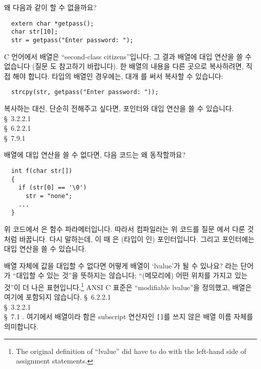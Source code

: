 \begin{faq}
	왜 다음과 같이 할 수 없을까요?
\begin{verbatim}
  extern char *getpass();
  char str[10];
  str = getpass("Enter password: ");
\end{verbatim}
\A
	C 언어에서 배열은 ``second-class citizens''입니다; 그 결과 배열에
	대입 연산을 쓸 수 없습니다 (질문 도 참고하기 바랍니다). 한 배열의
	내용을 다른 곳으로 복사하려면, 직접 해야 합니다.  타입의
	배열인 경우에는, 대개 를 써서 복사할 수 있습니다:
\begin{verbatim}
  strcpy(str, getpass("Enter password: "));
\end{verbatim}
	복사하는 대신, 단순히 전해주고 싶다면, 포인터와 대입 연산을 쓸 수
	있습니다. 
\R
	\cite{ansi} \S\ 3.2.2.1 \\
	\cite{c89} \S\ 6.2.2.1 \\
	\cite{hs} \S\ 7.9.1 
\end{faq}

\begin{faq}
	배열에 대입 연산을 쓸 수 없다면, 다음 코드는 왜 동작할까요?
\begin{verbatim}
  int f(char str[])
  {
    if (str[0] == '\0')
      str = "none";
    ...
  }
\end{verbatim}

\A
	위 코드에서 은 함수 파라메터입니다. 따라서 컴파일러는 위
	코드를 질문 에서 다룬 것처럼 바꿉니다.  다시 말하는데, 이 때
	은 (타입이 인) 포인터입니다. 그리고 포인터에는
	대입 연산을 쓸 수 있습니다.
\end{faq}

\begin{faq}
	배열 자체에 값을 대입할 수 없다면 어떻게 배열이 `lvalue'가
	될 수 있나요?
\A	
	라는 단어가 ``대입할 수 있는 것''을 뜻하지는 않습니다;
	``(메모리에) 어떤 위치를 가지고 있는 것''이 더 나은
	표현입니다.\footnote{The original definition of ``lvalue'' did
	  have to do with the left-hand side of assignment statements.}
	ANSI C 표준은 ``modifiable lvalue''을 정의했고, 배열은 여기에
	포함되지 않습니다. 
\R	\cite{c89} \S\ 6.2.2.1 \\
        \cite{rationale} \S\ 3.2.2.1 \\
        \cite{hs} \S\ 7.1 .
\T	여기에서 배열이라 함은 subscript 연산자인 \verb+[]+를 쓰지 않은
	배열 이름 자체를 의미합니다.
\end{faq}

